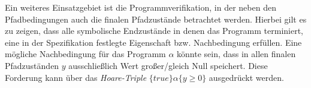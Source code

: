 Ein weiteres Einsatzgebiet ist die Programmverifikation, in der neben den Pfadbedingungen auch die finalen Pfadzustände betrachtet werden. Hierbei gilt es zu zeigen, dass alle symbolische Endzustände in denen das Programm terminiert, eine in der Spezifikation festlegte Eigenschaft bzw. Nachbedingung erfüllen. Eine mögliche Nachbedingung für das Programm $\alpha$ könnte sein, dass in allen finalen Pfadzuständen $y$ ausschließlich Wert großer/gleich Null speichert. Diese Forderung kann über das \emph{Hoare-Triple} $\{true\}\alpha\{y \geq 0\}$ ausgedrückt werden.
